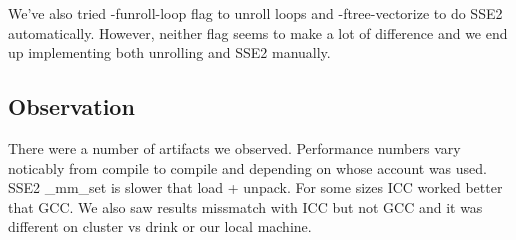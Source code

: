 \documentclass{article}
\begin{document}
We've also tried -funroll-loop flag to unroll loops and -ftree-vectorize to do SSE2 automatically.  However, neither flag seems to make a lot of difference and we end up implementing both unrolling and SSE2 manually.

\subsection{Observation}
There were a number of artifacts we observed. Performance numbers vary noticably  from compile to compile and depending on whose account was used.  SSE2 \_mm\_set is slower that load + unpack. For some sizes ICC worked better that GCC. We also saw results missmatch with ICC but not GCC and it was different on cluster vs drink or our local machine.
\end{document}
